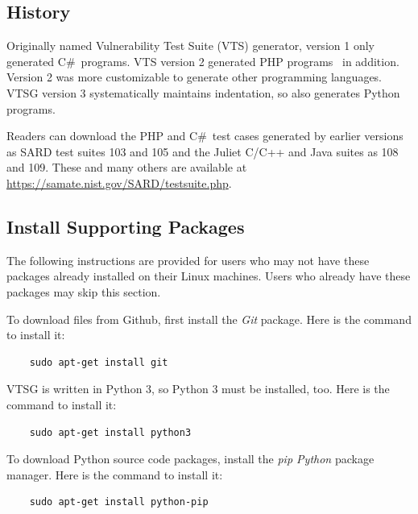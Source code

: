 \documentclass[12pt]{article}
\newcommand{\CSharp}{C{\fontseries{b}\selectfont\#}}
\begin{document}
\subsection{History} 

Originally named Vulnerability Test Suite (VTS) generator, version 1 only
generated \CSharp\ programs. VTS version 2 generated PHP
programs~\cite{StivaletFongVTSPHP2016} in addition.  Version 2 was more
customizable to generate other programming languages.
VTSG version 3 systematically maintains indentation, so also
generates Python programs.

Readers can download the PHP and \CSharp\ test cases generated by earlier
versions as SARD test suites 103 and 105 and the Juliet C/C++ and Java suites as 
108 and 109.  These and many others are available at
\href{https://samate.nist.gov/SARD/testsuite.php}{https://samate.nist.gov/SARD/testsuite.php}.


\subsection{Install Supporting Packages}

\noindent The following instructions are provided for users who may not have these
packages already installed on their Linux machines. Users who already have these
packages may skip this section.

\noindent To download files from Github, first install the \emph{Git} package.
Here is the command to install it:

\begin{verbatim}
    sudo apt-get install git    
\end{verbatim}

\noindent VTSG is written in Python 3, so Python 3 must be installed, too.
Here is the command to install it:

\begin{verbatim}
    sudo apt-get install python3
\end{verbatim}

\noindent To download Python source code packages, install the \emph{pip
Python} package manager.
Here is the command to install it:

\begin{verbatim}
    sudo apt-get install python-pip
\end{verbatim}
\end{document}
